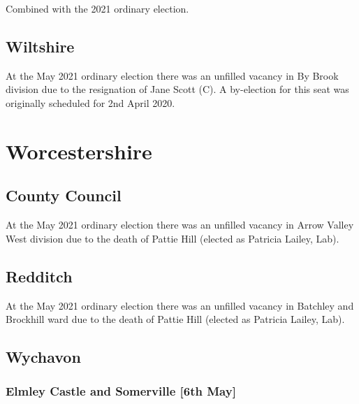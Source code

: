 \documentclass[a4paper,openany]{book}
\begin{document}
\begin{resultsiii}
Combined with the 2021 ordinary election.

\subsection*{Wiltshire}

At the May 2021 ordinary election there was an unfilled vacancy in By Brook division due to the resignation of Jane Scott (C).  A by-election for this seat was originally scheduled for 2nd April 2020.

\section{Worcestershire}

\subsection*{County Council}

At the May 2021 ordinary election there was an unfilled vacancy in Arrow Valley West division due to the death of Pattie Hill (elected as Patricia Lailey, Lab).

\subsection*{Redditch}

At the May 2021 ordinary election there was an unfilled vacancy in Batchley and Brockhill ward due to the death of Pattie Hill (elected as Patricia Lailey, Lab).

\subsection*{Wychavon}

\subsubsection*{Elmley Castle and Somerville \hspace*{\fill}\nolinebreak[1]%
	\enspace\hspace*{\fill}
	[6th May]}



\end{resultsiii}
\end{document}
